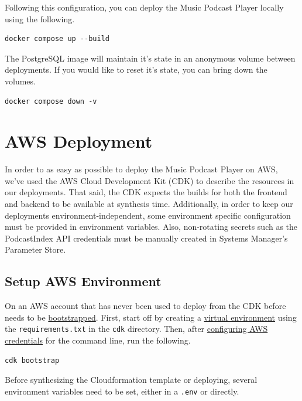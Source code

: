 \documentclass{article}
\begin{document}
Following this configuration, you can deploy the Music Podcast Player locally using
the following.

\begin{verbatim}
docker compose up --build
\end{verbatim}

The PostgreSQL image will maintain it's state in an anonymous volume between deployments.
If you would like to reset it's state, you can bring down the volumes.

\begin{verbatim}
docker compose down -v
\end{verbatim}

\section{AWS Deployment}

In order to as easy as possible to deploy the Music Podcast Player on AWS, we've used the
AWS Cloud Development Kit (CDK) to describe the resources in our deployments. That said,
the CDK expects the builds for both the frontend and backend to be available at
synthesis time. Additionally, in order to keep our deployments environment-independent, 
some environment specific configuration must be provided in environment variables. Also,
non-rotating secrets such as the PodcastIndex API credentials must be manually created in
Systems Manager's Parameter Store.

\subsection{Setup AWS Environment}

On an AWS account that has never been used to deploy from the CDK before needs to be 
\href{https://docs.aws.amazon.com/cdk/v2/guide/bootstrapping.html}{bootstrapped}. First,
start off by creating a \href{https://docs.python.org/3/library/venv.html}
{virtual environment} using the \verb|requirements.txt| in the \verb|cdk| directory.
Then, after
\href{https://docs.aws.amazon.com/cli/latest/userguide/getting-started-quickstart.html}
{configuring AWS credentials} for the command line, run the following.

\begin{verbatim}
cdk bootstrap
\end{verbatim}

Before synthesizing the Cloudformation template or deploying, several environment
variables need to be set, either in a \verb|.env| or directly.
\end{document}
